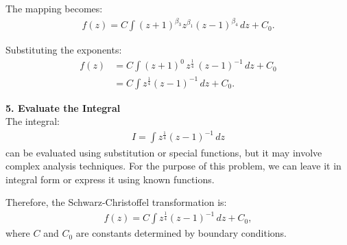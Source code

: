 \begin{example}
    The mapping becomes:
    \begin{align*}
        f(z) = C \int (z + 1)^{\beta_3} z^{\beta_1} (z - 1)^{\beta_4} \, dz + C_0.
    \end{align*}

    Substituting the exponents:
    \begin{align*}
        f(z) & = C \int (z + 1)^{0} \, z^{\frac{1}{4}} \, (z - 1)^{-1} \, dz + C_0 \\
             & = C \int z^{\frac{1}{4}} (z - 1)^{-1} \, dz + C_0.
    \end{align*}

    \textbf{5. Evaluate the Integral} \\

    The integral:
    \begin{align*}
        I = \int z^{\frac{1}{4}} (z - 1)^{-1} \, dz
    \end{align*}
    can be evaluated using substitution or special functions, but it may involve complex analysis techniques. For the purpose of this problem, we can leave it in integral form or express it using known functions.

    Therefore, the Schwarz-Christoffel transformation is:
    \begin{align*}
        f(z) = C \int z^{\frac{1}{4}} (z - 1)^{-1} \, dz + C_0,
    \end{align*}
    where $C$ and $C_0$ are constants determined by boundary conditions.
\end{example}